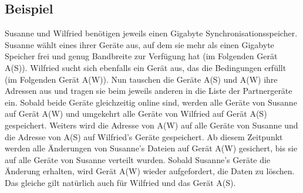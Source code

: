 \subsection{Beispiel}
Susanne und Wilfried benötigen jeweils einen Gigabyte Synchronisationsspeicher. Susanne wählt eines ihrer Geräte aus, auf dem sie mehr als einen Gigabyte Speicher frei und genug Bandbreite zur Verfügung hat (im Folgenden Gerät A(S)). Wilfried sucht sich ebenfalls ein Gerät aus, das die Bedingungen erfüllt (im Folgenden Gerät A(W)). Nun tauschen die Geräte A(S) und A(W) ihre Adressen aus und tragen sie beim jeweils anderen in die Liste der Partnergeräte ein. Sobald beide Geräte gleichzeitig online sind, werden alle Geräte von Susanne auf Gerät A(W) und umgekehrt alle Geräte von Wilfried auf Gerät A(S) gespeichert. Weiters wird die Adresse von A(W) auf alle Geräte von Susanne und die Adresse von A(S) auf Wilfried's Geräte gespeichert. Ab diesem Zeitpunkt werden alle Änderungen von Susanne's Dateien auf Gerät A(W) gesichert, bis sie auf alle Geräte von Susanne verteilt wurden. Sobald Susanne's Geräte die Änderung erhalten, wird Gerät A(W) wieder aufgefordert, die Daten zu löschen. Das gleiche gilt natürlich auch für Wilfried und das Gerät A(S). 